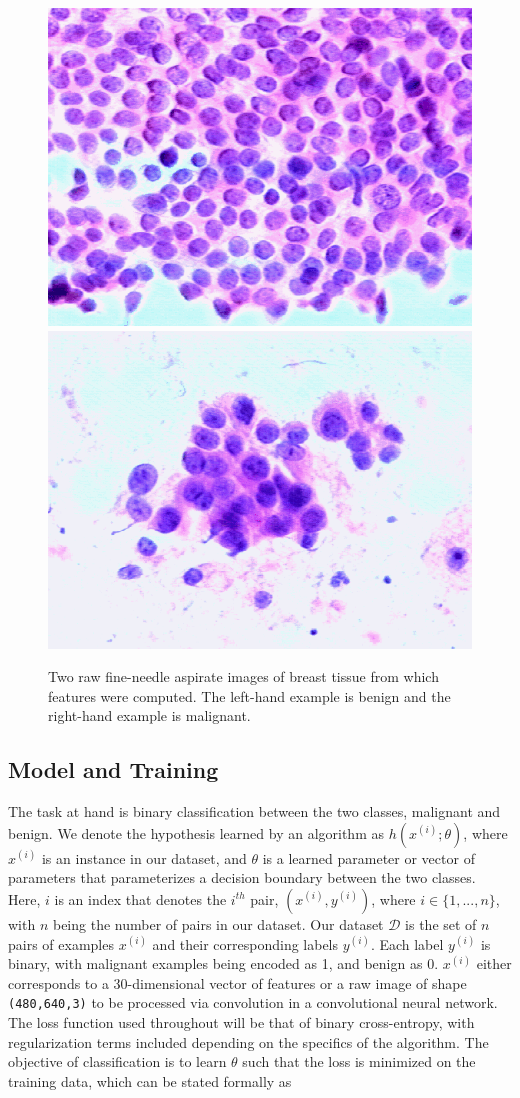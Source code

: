 \documentclass{article}
\begin{document}
	\begin{figure}[b]
		\vskip 0.2in
		\begin{center}
			\centerline{\includegraphics[width=0.4\columnwidth]{S_85_7373}\hspace{0.5em}\includegraphics[width=0.4\columnwidth]{S_87_12729}}
			\caption{Two raw fine-needle aspirate images of breast tissue from which features were computed. The left-hand example is benign and the right-hand example is malignant.}
			\label{raw-image}
		\end{center}
		\vskip -0.2in
	\end{figure}
	
	\subsection{Model and Training}
	The task at hand is binary classification between the two classes, malignant and benign. We denote the hypothesis learned by an algorithm as $h(x^{(i)}; \theta)$, where $x^{(i)}$ is an instance in our dataset, and $\theta$ is a learned parameter or vector of parameters that parameterizes a decision boundary between the two classes. Here, $i$ is an index that denotes the $i^{th}$ pair, $(x^{(i)}, y^{(i)})$, where $i \in \{1,...,n\}$, with $n$ being the number of pairs in our dataset. Our dataset $\mathcal{D}$ is the set of $n$ pairs of examples $x^{(i)}$ and their corresponding labels $y^{(i)}$. Each label $y^{(i)}$ is binary, with malignant examples being encoded as 1, and benign as 0. $x^{(i)}$ either corresponds to a 30-dimensional vector of features or a raw image of shape \texttt{(480,640,3)} to be processed via convolution in a convolutional neural network. The loss function used throughout will be that of binary cross-entropy, with regularization terms included depending on the specifics of the algorithm. The objective of classification is to learn $\theta$ such that the loss is minimized on the training data, which can be stated formally as
	
\end{document}
